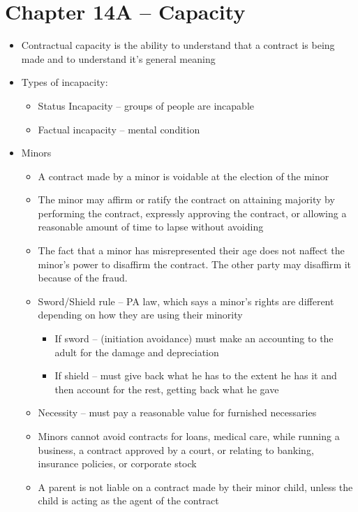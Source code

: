 \documentclass{article}
\begin{document}
	\section{Chapter 14A -- Capacity}
	\begin{itemize}
		\item Contractual capacity is the ability to understand that a contract is being made and to understand it's general meaning
		\item Types of incapacity:
		\begin{itemize}
			\item Status Incapacity -- groups of people are incapable
			\item Factual incapacity -- mental condition
		\end{itemize}
		\item Minors
		\begin{itemize}
			\item A contract made by a minor is voidable at the election of the minor
			\item The minor may affirm or ratify the contract on attaining majority by performing the contract, expressly approving the contract, or allowing a reasonable amount of time to lapse without avoiding
			\item The fact that a minor has misrepresented their age does not naffect the minor's power to disaffirm the contract. The other party may disaffirm it because of the fraud.
			\item Sword/Shield rule -- PA law, which says a minor's rights are different depending on how they are using their minority
			\begin{itemize}
				\item If sword -- (initiation avoidance) must make an accounting to the adult for the damage and depreciation 
				\item If shield -- must give back what he has to the extent he has it and then account for the rest, getting back what he gave
			\end{itemize}
			\item Necessity -- must pay a reasonable value for furnished necessaries
			\item Minors cannot avoid contracts for loans, medical care, while running a business, a contract approved by a court, or relating to banking, insurance policies, or corporate stock
			\item A parent is not liable on a contract made by their minor child, unless the child is acting as the agent of the contract

\end{itemize}
\end{itemize}
\end{document}
